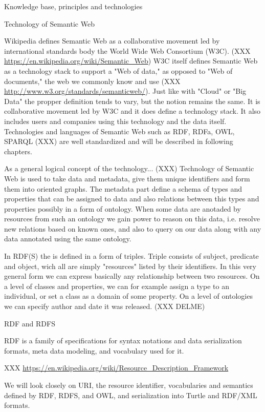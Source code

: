 \chap Knowledge base, principles and technologies

\sec Technology of Semantic Web

Wikipedia defines Semantic Web as a collaborative movement led by international
standards body the World Wide Web Consortium (W3C).  (XXX
\url{https://en.wikipedia.org/wiki/Semantic_Web}) W3C itself defines Semantic
Web as a technology stack to support a "Web of data," as opposed to "Web of
documents," the web we commonly know and use (XXX
\url{http://www.w3.org/standards/semanticweb/}). Just like with "Cloud" or "Big
Data" the propper definition tends to vary, but the notion remains the same.
It is collaborative movement led by W3C and it does define a technology stack.
It also includes users and companies using this technology and the data itself. 
Technologies and languages of Semantic Web such as RDF, RDFa, OWL, SPARQL (XXX)
are well standardized and will be described in following chapters. 

As a general logical concept of the technology... (XXX) Technology of Semantic
Web is used to take data and metadata, give them unique identifiers and form
them into oriented graphs. The metadata part define a schema of types and
properties that can be assigned to data and also relations between this types
and properties possibly in a form of ontology. When some data are anotaded by
resources from such an ontology we gain power to reason on this data, i.e.
resolve new relations based on known ones, and also to query on our data along
with any data annotated using the same ontology. 

In RDF(S) the  is defined in a form of triples. Triple consists of subject,
predicate and object, wich all are simply "resources" listed by their
identifiers. In this very general form we can express basically any
relationship between two resources. On a level of classes and properties, we
can for example assign a type to an individual, or set a class as a domain of
some property. On a level of ontologies we can specify author and date it was
released. (XXX DELME) 

\sec RDF and RDFS

RDF is a family of specifications for syntax notations and data serialization
formats, meta data modeling, and vocabulary used for it. 

XXX \url{https://en.wikipedia.org/wiki/Resource_Description_Framework}

We will look closely on URI, the resource identifier, vocabularies and
semantics defined by RDF, RDFS, and OWL, and serialization into Turtle and
RDF/XML formats. 

